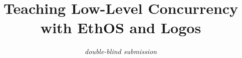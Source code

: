 \documentclass{sig-alternate-05-2015}
\begin{document}




\newcommand\carnegiemellon{{\em Double-Blind University}\xspace}
\newcommand\cmu{DBU\xspace}
\newcommand\pebbles{EthOS\xspace}
\newcommand\landslide{Logos\xspace}
\newcommand\fourten{CS999\xspace}
\newcommand\twothirteen{CS888\xspace}

\title{Teaching Low-Level Concurrency with \pebbles and \landslide}


\author{
	\em double-blind submission
}
\end{document}
